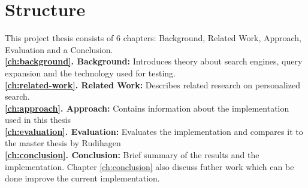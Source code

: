 \section{Structure}
This project thesis consists of 6 chapters: Background, Related Work, Approach, Evaluation and a Conclusion. \\

\textbf{ \ref{ch:background}. Background: } Introduces theory about search engines, query expansion and the technology used for testing. \\
\textbf{ \ref{ch:related-work}. Related Work:} Describes related research on personalized search. \\
\textbf{ \ref{ch:approach}. Approach: } Contains information about the implementation used in this thesis \\
\textbf{ \ref{ch:evaluation}. Evaluation: } Evaluates the implementation and compares it to the master thesis by Rudihagen \cite{master-thesis} \\
\textbf{ \ref{ch:conclusion}. Conclusion: } Brief summary of the results and the implementation. Chapter
\ref{ch:conclusion} also discuss futher work which can be done improve the current implementation.
